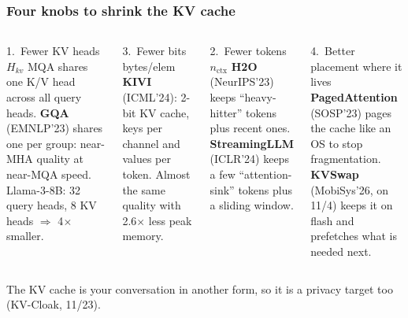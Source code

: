 \begin{frame}
\frametitle{Four knobs to shrink the KV cache}
\small
\begin{columns}[T]
\begin{block}{1.\ Fewer KV heads \hfill $H_{kv}$}
MQA shares one K/V head across all query heads. \textbf{GQA} (EMNLP'23) shares one per group: near-MHA quality at near-MQA speed. Llama-3-8B: 32 query heads, 8 KV heads $\Rightarrow$ 4$\times$ smaller.
\end{block}
\begin{block}{3.\ Fewer bits \hfill bytes/elem}
\textbf{KIVI} (ICML'24): 2-bit KV cache, keys per channel and values per token. Almost the same quality with 2.6$\times$ less peak memory.
\end{block}
\begin{block}{2.\ Fewer tokens \hfill $n_{\text{ctx}}$}
\textbf{H2O} (NeurIPS'23) keeps ``heavy-hitter'' tokens plus recent ones. \textbf{StreamingLLM} (ICLR'24) keeps a few ``attention-sink'' tokens plus a sliding window.
\end{block}
\begin{block}{4.\ Better placement \hfill where it lives}
\textbf{PagedAttention} (SOSP'23) pages the cache like an OS to stop fragmentation. \textbf{KVSwap} (MobiSys'26, on 11/4) keeps it on flash and prefetches what is needed next.
\end{block}
\end{columns}
\vspace{2pt}
The KV cache is your conversation in another form, so it is a privacy target too (KV-Cloak, 11/23).
\end{frame}


